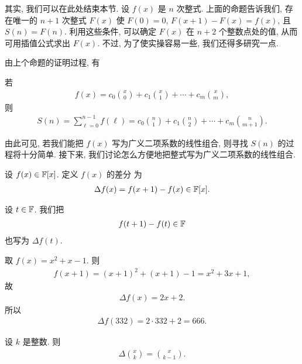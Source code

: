 其实, 我们可以在此处结束本节. 设 $f(x)$ 是 $n$ 次整式. 上面的命题告诉我们, 存在唯一的 $n+1$ 次整式 $F(x)$ 使 $F(0) = 0$, $F(x + 1) - F(x) = f(x)$, 且 $S(n) = F(n)$. 利用这些条件, 可以确定 $F(x)$ 在 $n+2$ 个整数点处的值, 从而可用插值公式求出 $F(x)$. 不过, 为了使实操容易一些, 我们还得多研究一点.

由上个命题的证明过程, 有

\begin{proposition}
    若
    \begin{align*}
        f(x) = c_0 \binom{x}{0} + c_1 \binom{x}{1} + \cdots + c_m \binom{x}{m},
    \end{align*}
    则
    \begin{align*}
        S(n) = \sum_{\ell = 0}^{n - 1} f(\ell) = c_0 \binom{n}{1} + c_1 \binom{n}{2} + \cdots + c_m \binom{n}{m + 1}.
    \end{align*}
\end{proposition}

由此可见, 若我们能把 $f(x)$ 写为广义二项系数的线性组合, 则寻找 $S(n)$ 的过程将十分简单. 接下来, 我们讨论怎么方便地把整式写为广义二项系数的线性组合.

\begin{definition}
    设 $f(x) \in \mathbb{F}[x]$. 定义 $f(x)$ 的差分  为
    \begin{align*}
        \Delta f(x) = f(x+1) - f(x) \in \mathbb{F}[x].
    \end{align*}

    设 $t \in \mathbb{F}$. 我们把
    \begin{align*}
        f(t+1) - f(t) \in \mathbb{F}
    \end{align*}
    也写为 $\Delta f(t)$.
\end{definition}

\begin{example}
    取 $f(x) = x^2 + x - 1$. 则
    \begin{align*}
        f(x + 1) = (x + 1)^2 + (x + 1) - 1 = x^2 + 3x + 1,
    \end{align*}
    故
    \begin{align*}
        \Delta f(x) = 2x + 2.
    \end{align*}
    所以
    \begin{align*}
        \Delta f(332) = 2 \cdot 332 + 2 = 666.
    \end{align*}
\end{example}

\begin{proposition}
    设 $k$ 是整数. 则
    \begin{align*}
        \Delta \binom{x}{k} = \binom{x}{k - 1}.
    \end{align*}
\end{proposition}

